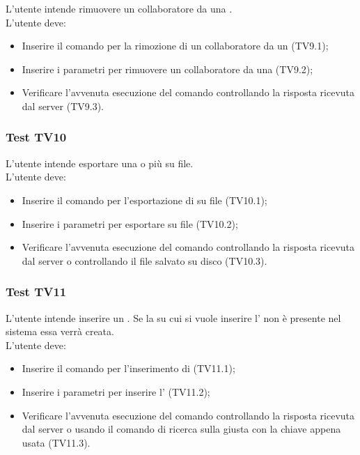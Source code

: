 \documentclass{scalatekids-article}
\begin{document}
L'utente intende rimuovere un collaboratore da una .\\
L'utente deve:
\begin{itemize}
\item Inserire il comando per la rimozione di un collaboratore da un  (TV9.1);
\item Inserire i parametri per rimuovere un collaboratore da una  (TV9.2);
\item Verificare l'avvenuta esecuzione del comando controllando la risposta ricevuta dal server (TV9.3).
\end{itemize}

\subsubsection{Test TV10}

L'utente intende esportare una o più  su file.\\
L'utente deve:
\begin{itemize}
\item Inserire il comando per l'esportazione di  su file (TV10.1);
\item Inserire i parametri per esportare  su file (TV10.2);
\item Verificare l'avvenuta esecuzione del comando controllando la risposta ricevuta dal server o controllando il file salvato su disco (TV10.3).
\end{itemize}

\subsubsection{Test TV11}

L'utente intende inserire un . Se la  su cui si
vuole inserire l' non è presente nel sistema essa verrà creata.\\
L'utente deve:
\begin{itemize}
\item Inserire il comando per l'inserimento di  (TV11.1);
\item Inserire i parametri per inserire l' (TV11.2);
\item Verificare l'avvenuta esecuzione del comando controllando la risposta ricevuta dal server o usando il comando di ricerca sulla  giusta con la chiave appena usata (TV11.3).
\end{itemize}
\end{document}
